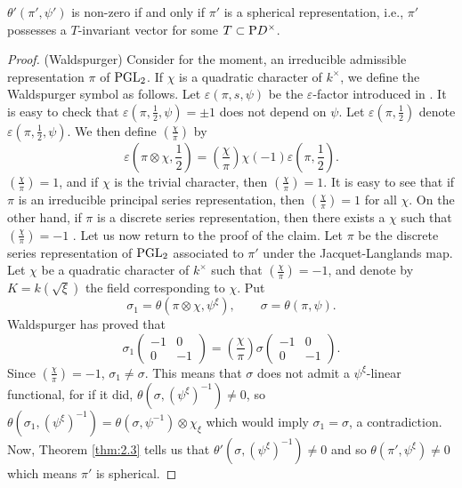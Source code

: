 \begin{claim}
$\theta'(\pi', \psi')$ is non-zero if and only if $\pi'$ is a spherical representation, i.e., $\pi'$ possesses a $T$-invariant vector for some $T \subset \mathrm{P} D^\times$.
\end{claim}

\begin{proof}(Waldspurger)
Consider for the moment, an irreducible admissible representation $\pi$ of $\mathrm{PGL}_2$.
If $\chi$ is a quadratic character of $k^\times$, we define the Waldspurger symbol as follows.
Let $\varepsilon(\pi, s, \psi)$ be the $\varepsilon$-factor introduced in \cite{jl70gl2}.
It is easy to check that $\varepsilon(\pi, \frac{1}{2}, \psi) = \pm 1$ does not depend on $\psi$.
Let $\varepsilon(\pi, \frac{1}{2})$ denote $\varepsilon(\pi, \frac{1}{2}, \psi)$.
We then define $\left(\frac{\chi}{\pi}\right)$ by
\[
\varepsilon\left(\pi \otimes \chi, \frac{1}{2}\right) = \left( \frac{\chi}{\pi} \right) \chi(-1) \varepsilon\left( \pi, \frac{1}{2}\right).
\]
$\left(\frac{\chi}{\pi}\right) = 1$, and if $\chi$ is the trivial character, then $\left(\frac{\chi}{\pi}\right) = 1$.
It is easy to see that if $\pi$ is an irreducible principal series representation, then $\left(\frac{\chi}{\pi}\right) =1$ for all $\chi$.
On the other hand, if $\pi$ is a discrete series representation, then there exists a $\chi$ such that $\left(\frac{\chi}{\pi}\right) = -1$ \cite{waldspurger91quaternion}.
Let us now return to the proof of the claim.
Let $\pi$ be the discrete series representation of $\mathrm{PGL}_2$ associated to $\pi'$ under the Jacquet-Langlands map.
Let $\chi$ be a quadratic character of $k^\times$ such
that $\left(\frac{\chi}{\pi}\right) = -1$, and denote by $K = k(\sqrt{\xi})$ the field corresponding to $\chi$.
Put
\[
\sigma_1 = \theta(\pi \otimes \chi, \psi^{\xi}),\qquad \sigma = \theta(\pi, \psi).
\]
Waldspurger has proved that 
\[
\sigma_1\begin{pmatrix}
    -1 & 0 \\ 0 & -1
\end{pmatrix} = \left(\frac{\chi}{\pi}\right) \sigma\begin{pmatrix}
    -1 & 0 \\ 0 & -1
\end{pmatrix}.
\]
Since $\left(\frac{\chi}{\pi}\right) = -1$, $\sigma_1 \neq \sigma$.
This means that $\sigma$ does not admit a $\psi^\xi$-linear functional, for if it did, $\theta(\sigma, (\psi^{\xi})^{-1}) \neq 0$, so $\theta(\sigma_1, (\psi^{\xi})^{-1}) = \theta(\sigma, \psi^{-1}) \otimes \chi_\xi$ which would imply $\sigma_1 = \sigma$, a contradiction.
Now, Theorem \ref{thm:2.3} tells us that $\theta'(\sigma, (\psi^{\xi})^{-1}) \neq 0$ and so $\theta(\pi', \psi^{\xi}) \neq 0$ which means $\pi'$ is spherical.
\end{proof}

